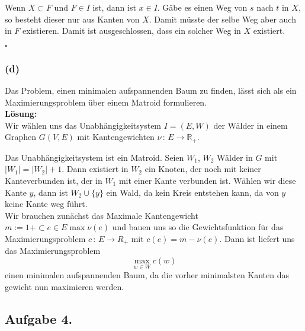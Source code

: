 \documentclass[11pt,a4paper,ngerman]{article}
\begin{document}
Wenn $X \subset F$ und $F \in I$ ist, dann ist $x \in I$. Gäbe es einen Weg von $s$ nach $t$ in $X$, so besteht dieser nur aus Kanten von $X$.
Damit müsste der selbe Weg aber auch in $F$ existieren. Damit ist ausgeschlossen, dass ein solcher Weg in $X$ existiert.

\mbox{}\hfill $\square$

\subsubsection*{(d)}

Das Problem, einen minimalen aufspannenden Baum zu finden, lässt sich als ein Maximierungsproblem über einem Matroid formulieren.\\

\textbf{Lösung:}\\

Wir wählen uns das Unabhängigkeitsystem $I = (E, W)$ der Wälder in einem Graphen $G(V,E)$ mit Kantengewichten $\nu \, : \, E \rightarrow \mathbb{R_+}$.

Das Unabhängigkeitsystem ist ein Matroid. Seien $W_1$, $W_2$ Wälder in $G$ mit $|W_1| = |W_2| + 1$.
Dann existiert in $W_2$ ein Knoten, der noch mit keiner Kanteverbunden ist, der in $W_1$ mit einer Kante verbunden ist.
Wählen wir diese Kante $y$, dann ist $W_2 \cup \{y \}$ ein Wald, da kein Kreis entstehen kann, da von $y$ keine Kante weg führt.\\

Wir brauchen zunächst das Maximale Kantengewicht $m := 1 + \subset{e \in E}{\max} \nu (e)$ und bauen uns so
die Gewichtsfunktion für das Maximierungsproblem $c \, : \, E \rightarrow R_+$ mit
$c(e) = m - \nu (e)$.
Dann ist liefert uns das Maximierungsproblem
$$
    \underset{w \in W}{\max} c(w)
$$
einen minimalen aufspannenden Baum, da die vorher minimalsten Kanten das gewicht nun maximieren werden.

\subsection*{Aufgabe 4.}
\end{document}
